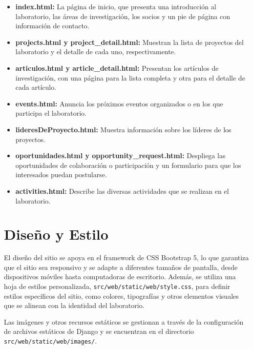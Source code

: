 \begin{itemize}
    \item \textbf{index.html:} La página de inicio, que presenta una introducción al laboratorio, las áreas de investigación, los socios y un pie de página con información de contacto.
    \item \textbf{projects.html y project\_detail.html:} Muestran la lista de proyectos del laboratorio y el detalle de cada uno, respectivamente.
    \item \textbf{articulos.html y article\_detail.html:} Presentan los artículos de investigación, con una página para la lista completa y otra para el detalle de cada artículo.
    \item \textbf{events.html:} Anuncia los próximos eventos organizados o en los que participa el laboratorio.
    \item \textbf{lideresDeProyecto.html:} Muestra información sobre los líderes de los proyectos.
    \item \textbf{oportunidades.html y opportunity\_request.html:} Despliega las oportunidades de colaboración o participación y un formulario para que los interesados puedan postularse.
    \item \textbf{activities.html:} Describe las diversas actividades que se realizan en el laboratorio.
\end{itemize}

\section{Diseño y Estilo}

El diseño del sitio se apoya en el framework de CSS Bootstrap 5, lo que garantiza que el sitio sea responsivo y se adapte a diferentes tamaños de pantalla, desde dispositivos móviles hasta computadoras de escritorio. Además, se utiliza una hoja de estilos personalizada, \texttt{src/web/static/web/style.css}, para definir estilos específicos del sitio, como colores, tipografías y otros elementos visuales que se alinean con la identidad del laboratorio.

Las imágenes y otros recursos estáticos se gestionan a través de la configuración de archivos estáticos de Django y se encuentran en el directorio \texttt{src/web/static/web/images/}.